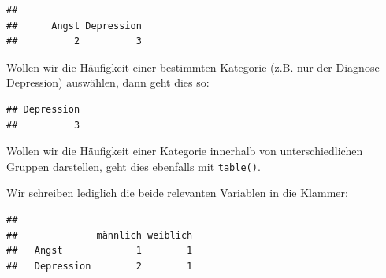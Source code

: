 \documentclass[
]{book}
\newenvironment{Shaded}{\begin{snugshade}}{\end{snugshade}}
\newcommand{\AttributeTok}[1]{\textcolor[rgb]{0.77,0.63,0.00}{#1}}
\newcommand{\FunctionTok}[1]{\textcolor[rgb]{0.00,0.00,0.00}{#1}}
\newcommand{\NormalTok}[1]{#1}
\newcommand{\OtherTok}[1]{\textcolor[rgb]{0.56,0.35,0.01}{#1}}
\newcommand{\SpecialCharTok}[1]{\textcolor[rgb]{0.00,0.00,0.00}{#1}}
\newcommand{\StringTok}[1]{\textcolor[rgb]{0.31,0.60,0.02}{#1}}
\begin{document}
\begin{Shaded}
\end{Shaded}

\begin{verbatim}
## 
##      Angst Depression 
##          2          3
\end{verbatim}

Wollen wir die Häufigkeit einer bestimmten Kategorie (z.B. nur der Diagnose Depression) auswählen, dann geht dies so:

\begin{Shaded}
\end{Shaded}

\begin{verbatim}
## Depression 
##          3
\end{verbatim}

Wollen wir die Häufigkeit einer Kategorie innerhalb von unterschiedlichen Gruppen darstellen, geht dies ebenfalls mit \texttt{table()}.

Wir schreiben lediglich die beide relevanten Variablen in die Klammer:

\begin{Shaded}
\end{Shaded}

\begin{verbatim}
##             
##              männlich weiblich
##   Angst             1        1
##   Depression        2        1
\end{verbatim}
\end{document}
